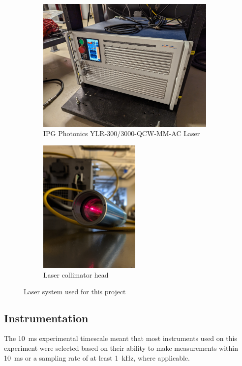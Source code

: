             \begin{figure}[h]
                \centering
                \begin{subfigure}[t]{0.6\textwidth}
                    \centering
                    \includegraphics[height=2.6in]{assets/3 design/laser.jpg}
                    \caption{IPG Photonics YLR-300/3000-QCW-MM-AC Laser}
                    \label{fig:laser_laser}
                \end{subfigure}
                \hfill
                \begin{subfigure}[t]{0.35\textwidth}
                    \centering
                    \includegraphics[height=2.6in]{assets/3 design/collimator_r.jpg}
                    \caption{Laser collimator head}
                    \label{fig:laser_collimator}
                \end{subfigure}
                \caption{Laser system used for this project}
                \label{fig:laser}
            \end{figure}

        \subsection{Instrumentation}
            The 10~ms experimental timescale meant that most instruments used on this experiment were selected based on their ability to make measurements within 10~ms or a sampling rate of at least \qty{1}{kHz}, where applicable.    

